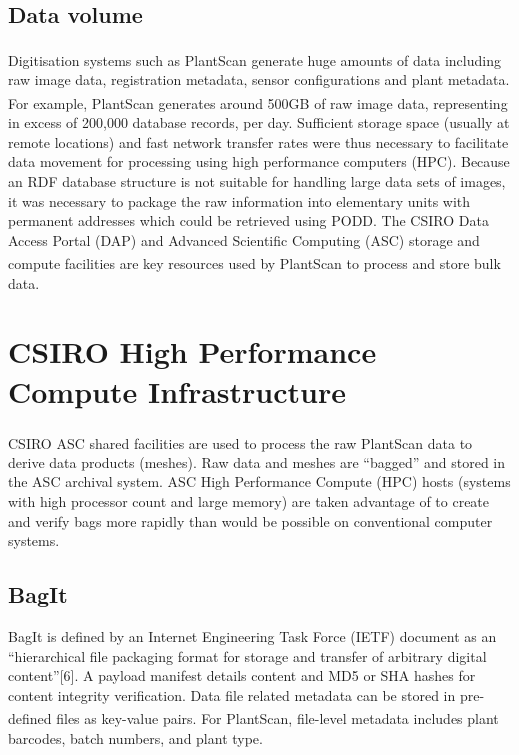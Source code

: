 \documentclass{llncs}
\begin{document}
\subsection{Data volume}
Digitisation systems such as PlantScan\textsuperscript{\texttrademark} generate
huge amounts of data including
raw image data, registration metadata, sensor configurations and plant metadata.
For example, PlantScan\textsuperscript{\texttrademark} generates around 500GB of
raw image data, representing
in excess of 200,000 database records, per day. Sufficient storage space
(usually at remote locations) and fast network transfer rates were thus
necessary to facilitate data movement for processing using high performance
computers (HPC). Because an RDF database structure is not suitable for handling
large data sets of images, it was necessary to package the raw information into
elementary units with permanent addresses which could be retrieved using PODD. 
The CSIRO Data Access Portal (DAP) \cite{DAP} and Advanced
Scientific Computing (ASC) storage and compute facilities \cite{ASC} are key resources used by
PlantScan\textsuperscript{\texttrademark} to
process and store bulk data.


\section{CSIRO High Performance Compute Infrastructure}
CSIRO ASC shared facilities \cite{ASC} are used to process the raw
PlantScan\textsuperscript{\texttrademark} data to
derive data products (meshes). Raw data and meshes are ``bagged'' and stored in
the ASC archival system. ASC High Performance Compute (HPC) hosts (systems with
high processor count and large memory) are taken advantage of to create and
verify bags more rapidly than would be possible on conventional computer
systems.

\subsection{BagIt}

BagIt is defined by an Internet Engineering Task Force (IETF) document as an
``hierarchical file packaging format for storage and transfer of arbitrary
digital content''[6]. A payload manifest details content and MD5 or SHA hashes
for content integrity verification. Data file related metadata can be stored in
pre-defined files as key-value pairs. For
PlantScan\textsuperscript{\texttrademark}, file-level metadata
includes plant barcodes, batch numbers, and plant type.
\end{document}
